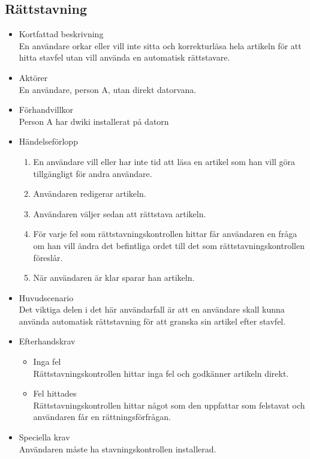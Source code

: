 \subsection{Rättstavning}
\begin{itemize}
	\item Kortfattad beskrivning
	\\En användare orkar eller vill inte sitta och korrekturläsa hela artikeln för att hitta stavfel utan vill använda en automatisk rättstavare.
	\item Aktörer
	\\En användare, person A, utan direkt datorvana.
	\item Förhandvillkor
	\\Person A har dwiki installerat på datorn
	\item Händelseförlopp
	\begin{enumerate}
		\item En användare vill eller har inte tid att läsa en artikel som han vill göra tillgängligt för andra användare.
		\item Användaren redigerar artikeln.
		\item Användaren väljer sedan att rättstava artikeln.
		\item För varje fel som rättstavningskontrollen hittar får användaren en fråga om han vill ändra det befintliga ordet till det som rättstavningskontrollen föreslår.
		\item När användaren är klar sparar han artikeln.
	\end{enumerate}
	\item Huvudscenario
	\\Det viktiga delen i det här användarfall är att en användare skall kunna använda automatisk rättstavning för att granska sin artikel efter stavfel.
	\item Efterhandskrav
	\begin{itemize}
	\item Inga fel
	\\Rättstavningskontrollen hittar inga fel och godkänner artikeln direkt.
	\item Fel hittades
	\\Rättstavningskontrollen hittar något som den uppfattar som felstavat och användaren får en rättningsförfrågan.
	\end{itemize}	
	\item Speciella krav
	\\Användaren måste ha stavningskontrollen installerad.
\end{itemize}

